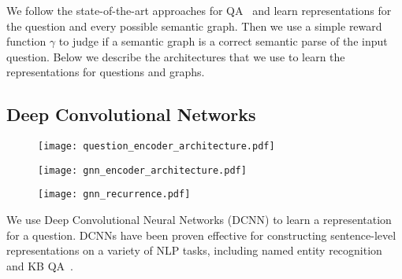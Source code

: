 \documentclass[11pt]{article}
\begin{document}
We follow the state-of-the-art approaches for QA~\cite{Yih2015,Dong2015,Bao2016} and learn representations for the question and every possible semantic graph. Then we use a simple reward function $\gamma$ to judge if a semantic graph is a correct semantic parse of the input question. Below we describe the architectures that we use to learn the representations for questions and graphs. 

\subsection{Deep Convolutional Networks}
\label{sec:dcnn}

\begin{figure}[t]
  \begin{minipage}{0.49\linewidth}
\begin{center}
\texttt{[image: question\_encoder\_architecture.pdf]}
\end{center}
\end{minipage}\hfill \begin{minipage}{0.49\linewidth}
   \begin{center}
    \texttt{[image: gnn\_encoder\_architecture.pdf]}
    \end{center}
\begin{center}
      \texttt{[image: gnn\_recurrence.pdf]}
      \end{center}
  \end{minipage}
\end{figure}

We use Deep Convolutional Neural Networks (DCNN) to learn a representation for a question. DCNNs have been proven effective for constructing sentence-level representations on a variety of NLP tasks, including named entity recognition~\cite{Strubell2017} and KB QA~\cite{Yih2015,Dong2015}.  
\end{document}
